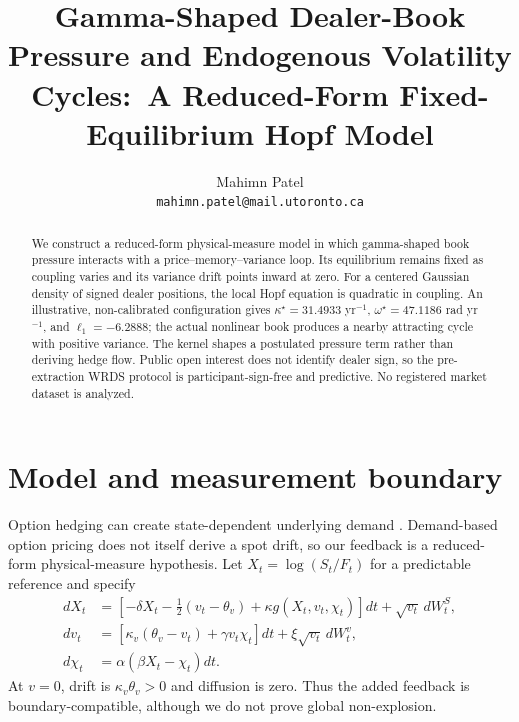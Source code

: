 \documentclass{article}
\title{Gamma-Shaped Dealer-Book Pressure and Endogenous Volatility Cycles:\
A Reduced-Form Fixed-Equilibrium Hopf Model}
\author{Mahimn Patel\\
\texttt{mahimn.patel@mail.utoronto.ca}}
\begin{document}
\maketitle

\begin{abstract}
We construct a reduced-form physical-measure model in which gamma-shaped book
pressure interacts with a price--memory--variance loop. Its equilibrium remains
fixed as coupling varies and its variance drift points inward at zero. For a
centered Gaussian density of signed dealer positions, the local Hopf equation is
quadratic in coupling. An illustrative, non-calibrated configuration gives
$\kappa^\star=31.4933$ yr$^{-1}$, $\omega^\star=47.1186$ rad yr$^{-1}$,
and $\ell_1=-6.2888$; the actual nonlinear book produces a nearby attracting
cycle with positive variance. The kernel shapes a postulated pressure term
rather than deriving hedge flow. Public open interest does not identify dealer
sign, so the pre-extraction WRDS protocol is participant-sign-free and
predictive. No registered market dataset is analyzed.
\end{abstract}

\section{Model and measurement boundary}

Option hedging can create state-dependent underlying demand
\citep{freystremme1997,sircarpapanicolaou1998}. Demand-based option pricing
\citep{garleanu2009demand} does not itself derive a spot drift, so our feedback
is a reduced-form physical-measure hypothesis. Let
$X_t=\log(S_t/F_t)$ for a predictable reference and specify
\begin{align}
dX_t&=[-\delta X_t-\tfrac12(v_t-\theta_v)+\kappa g(X_t,v_t,\chi_t)]dt
+\sqrt{v_t}\,dW_t^S,\label{eq:x}\\
dv_t&=[\kappa_v(\theta_v-v_t)+\gamma v_t\chi_t]dt
+\xi\sqrt{v_t}\,dW_t^v,\label{eq:v}\\
d\chi_t&=\alpha(\beta X_t-\chi_t)dt.\label{eq:chi}
\end{align}
At $v=0$, drift is $\kappa_v\theta_v>0$ and diffusion is zero. Thus the added
feedback is boundary-compatible, although we do not prove global non-explosion.
\end{document}
